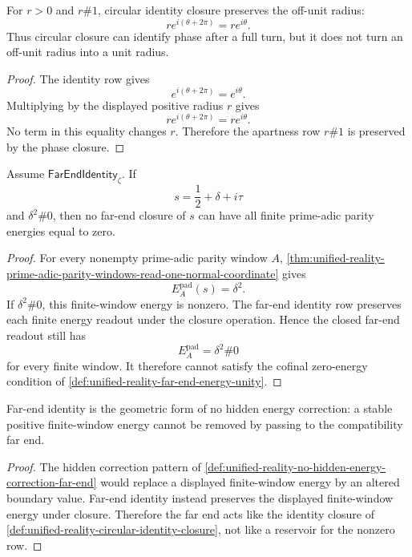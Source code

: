 \begin{theorem}
\label{thm:unified-reality-circular-identity-does-not-repair-radius}
For $r>0$ and $r\#1$, circular identity closure preserves the off-unit
radius:
$$
r e^{i(\theta+2\pi)}=r e^{i\theta}.
$$
Thus circular closure can identify phase after a full turn, but it does
not turn an off-unit radius into a unit radius.
\end{theorem}

\begin{proof}
The identity row gives
$$
e^{i(\theta+2\pi)}=e^{i\theta}.
$$
Multiplying by the displayed positive radius $r$ gives
$$
r e^{i(\theta+2\pi)}=r e^{i\theta}.
$$
No term in this equality changes $r$.  Therefore the apartness row
$r\#1$ is preserved by the phase closure.
\end{proof}

\begin{theorem}
\label{thm:unified-reality-far-end-identity-preserves-normal-energy}
Assume $\mathsf{FarEndIdentity}_{\zeta}$.  If
$$
s=\frac12+\delta+i\tau
$$
and $\delta^2\#0$, then no far-end closure of $s$ can have all finite
prime-adic parity energies equal to zero.
\end{theorem}

\begin{proof}
For every nonempty prime-adic parity window $A$,
\autoref{thm:unified-reality-prime-adic-parity-windows-read-one-normal-coordinate}
gives
$$
E_A^{\mathrm{pad}}(s)=\delta^2.
$$
If $\delta^2\#0$, this finite-window energy is nonzero.  The far-end
identity row preserves each finite energy readout under the closure
operation.  Hence the closed far-end readout still has
$$
E_A^{\mathrm{pad}}=\delta^2\#0
$$
for every finite window.  It therefore cannot satisfy the cofinal
zero-energy condition of
\autoref{def:unified-reality-far-end-energy-unity}.
\end{proof}

\begin{corollary}
\label{cor:unified-reality-far-end-identity-excludes-hidden-energy-absorption}
Far-end identity is the geometric form of no hidden energy correction:
a stable positive finite-window energy cannot be removed by passing to
the compatibility far end.
\end{corollary}

\begin{proof}
The hidden correction pattern of
\autoref{def:unified-reality-no-hidden-energy-correction-far-end} would
replace a displayed finite-window energy by an altered boundary value.
Far-end identity instead preserves the displayed finite-window energy
under closure.  Therefore the far end acts like the identity closure of
\autoref{def:unified-reality-circular-identity-closure}, not like a
reservoir for the nonzero row.
\end{proof}

